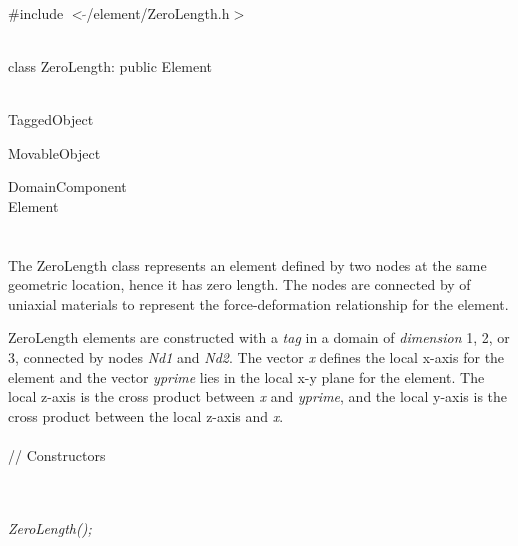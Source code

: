 
   \\
\#include $<\tilde{ }$/element/ZeroLength.h$>$  


  \\
class ZeroLength: public Element 


 \\
TaggedObject 

MovableObject 

\indent\indent DomainComponent \\
\indent\indent\indent Element \\
\indent\indent\indent{} \\

  \\
\indent 
The ZeroLength class represents an element defined by two nodes at the same geometric
location, hence it has zero length.
The nodes are connected by 
of uniaxial materials to represent the force-deformation relationship for the element. 

ZeroLength elements are constructed with a {\em tag} in a domain of {\em dimension} 1, 2, or 3,
connected by nodes {\em Nd1} and {\em Nd2}. 
The vector {\em x} defines the local x-axis for the element and the vector {\em yprime}
lies in the local x-y plane for the element.  The local z-axis is the cross product between 
{\em x} and {\em yprime}, and the local y-axis is the cross product between the local z-axis
and {\em x}.
\\

 \\
// Constructors 

 \\

 \\

{\em    ZeroLength();} \\ 

